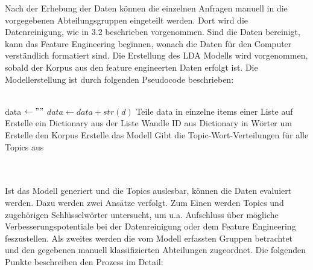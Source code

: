 \documentclass[german,version-2020-11]{uzl-thesis}
\begin{document}
Nach der Erhebung der Daten können die einzelnen Anfragen manuell in die vorgegebenen Abteilungsgruppen eingeteilt werden. Dort wird die Datenreinigung, wie in 3.2 beschrieben vorgenommen. Sind die Daten bereinigt, kann das Feature Engineering beginnen, wonach die Daten für den Computer verständlich formatiert sind. Die Erstellung des LDA Modells wird vorgenommen, sobald der Korpus aus den feature engineerten Daten erfolgt ist. Die Modellerstellung ist durch folgenden Pseudocode beschrieben: \\
\\

\begin{algorithm}
\begin{algorithmic}
\STATE data $\leftarrow ""$
 $data \leftarrow data + str(d)$\ENDFOR 
\STATE Teile data in einzelne items einer Liste auf
\STATE Erstelle ein Dictionary aus der Liste
\STATE Wandle ID aus Dictionary in Wörter um
\STATE Erstelle den Korpus
\STATE Erstelle das Modell
\STATE Gibt die Topic-Wort-Verteilungen für alle Topics aus
\end{algorithmic}
\end{algorithm}
\\
\\

Ist das Modell generiert und die Topics auslesbar, können die Daten evaluiert werden. Dazu werden zwei Ansätze verfolgt. Zum Einen werden Topics und zugehörigen Schlüsselwörter untersucht, um u.a. Aufschluss über mögliche Verbesserungspotentiale bei der Datenreinigung oder dem Feature Engineering feszustellen. Als zweites werden die vom Modell erfassten Gruppen betrachtet und den gegebenen manuell klassifizierten Abteilungen zugeordnet. Die folgenden Punkte beschreiben den Prozess im Detail: \\
\end{document}
